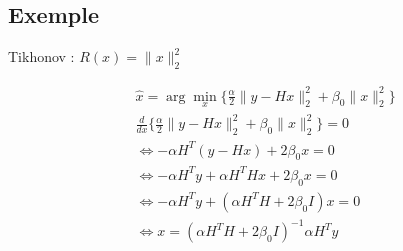 \subsection{Exemple}

\frame{
    \tableofcontents[ 
        currentsubsection, 
    ]
}

    

\begin{frame}{Tikhonov : $R(x) = \lVert x \rVert_{2}^{2}$}

\begin{align*}
&\hat{x} = \arg\min\limits_{x} \{ 
    \frac{\alpha}{2} \lVert y - Hx \rVert_{2}^{2} 
    + \beta_{0} \lVert x \rVert_{2}^{2}
\} \\
&\frac{d}{dx} \{
    \frac{\alpha}{2} \lVert y - Hx \rVert_{2}^{2} 
    + \beta_{0} \lVert x \rVert_{2}^{2}
\} = 0 \\
&\iff - \alpha H^{T} (y - Hx) + 2 \beta_{0} x = 0 \\
&\iff - \alpha H^{T} y + \alpha H^{T}Hx + 2 \beta_{0} x = 0 \\
&\iff - \alpha H^{T} y + (\alpha H^{T}H + 2 \beta_{0} I) x = 0 \\
&\iff x = (\alpha H^{T}H + 2\beta_{0} I)^{-1} \alpha H^{T} y \\
\end{align*}

\end{frame}